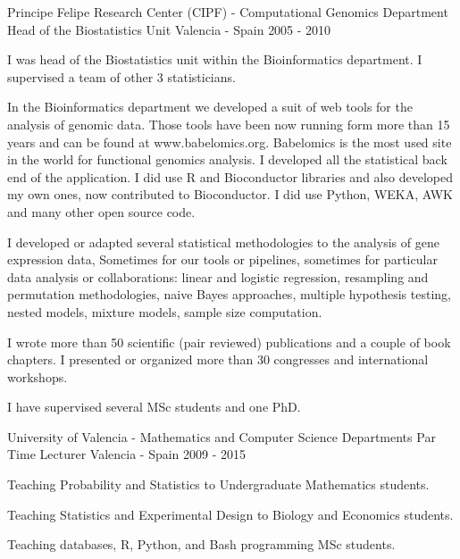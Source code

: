 \begin{cventries}
\cventry
{Principe Felipe Research Center (CIPF) - Computational Genomics Department} %
{Head of the Biostatistics Unit} %
{Valencia - Spain} %
{2005 - 2010} %
{ %
\begin{cvitems}
\item {
I was head of the Biostatistics unit within the Bioinformatics department.
I supervised a team of other 3 statisticians.
}
\item {
In the Bioinformatics department we developed a suit of web tools for the analysis of genomic data.
Those tools have been now running form more than 15 years and can be found at www.babelomics.org.
Babelomics is the most used site in the world for functional genomics analysis.
I developed all the statistical back end of the application.
I did use R and Bioconductor libraries and also developed my own ones, now contributed to Bioconductor.
I did use Python, WEKA, AWK and many other open source code.
}
\item {
I developed or adapted several statistical methodologies to the analysis of gene expression data,
Sometimes for our tools or pipelines, sometimes for particular data analysis or collaborations:
linear and logistic regression, resampling and permutation methodologies, naive Bayes approaches,
multiple hypothesis testing, nested models, mixture models, sample size computation.
}
\item {
I wrote more than 50 scientific (pair reviewed) publications and a couple of book chapters.
I presented or organized more than 30 congresses and international workshops.
}
\item {
I have supervised several MSc students and one PhD.
}
\end{cvitems} 
}


\cventry
{University of Valencia - Mathematics and Computer Science Departments} %
{Par Time Lecturer} %
{Valencia - Spain} %
{2009 - 2015} %
{ %
\begin{cvitems}
\item {Teaching Probability and Statistics to Undergraduate Mathematics students.}
\item {Teaching Statistics and Experimental Design to Biology and Economics students.}
\item {Teaching databases, R, Python, and Bash programming MSc students.}
\end{cvitems} 
}


\end{cventries}
